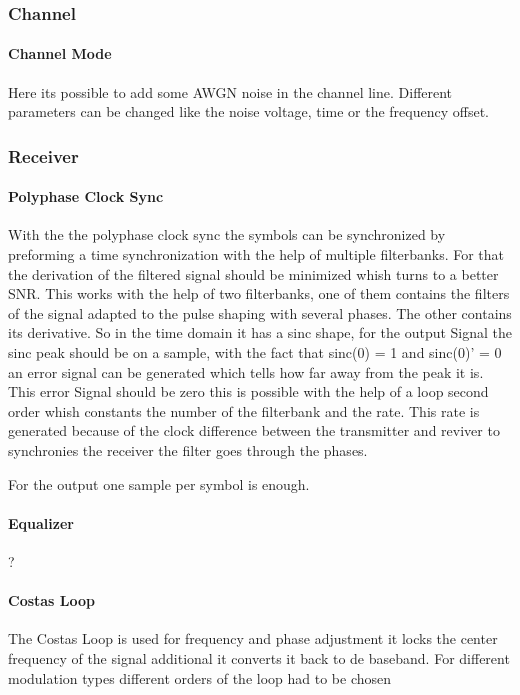 \subsubsection{Channel}
\paragraph{Channel Mode}
Here its possible to add some AWGN noise in the channel line. Different parameters can be changed like the noise voltage, time or the frequency offset.

\subsubsection{Receiver}
\paragraph{Polyphase Clock Sync}
With the the polyphase clock sync the symbols can be synchronized by preforming a time synchronization with the help of multiple filterbanks. For that the derivation of the filtered signal should be minimized whish turns to a better SNR. This works with the help of two filterbanks, one of them contains the filters of the signal adapted to the pulse shaping with several phases. The other contains its derivative. So in the time domain it has a sinc shape, for the output Signal the sinc peak should be on a sample, with the fact that sinc(0) = 1 and sinc(0)' = 0 an error signal can be generated which tells how far away from the peak it is. This error Signal should be zero this is possible with the help of a loop second order whish constants the number of the filterbank and the rate. This rate is generated because of the clock difference between the transmitter and reviver to synchronies the receiver the filter goes through the phases.

For the output one sample per symbol is enough.

\paragraph{Equalizer}
?


\paragraph{Costas Loop}

The Costas Loop is used for frequency and phase adjustment it locks the center frequency of the signal additional it converts it back to de baseband.  For different modulation types different orders of the loop had to be chosen 

